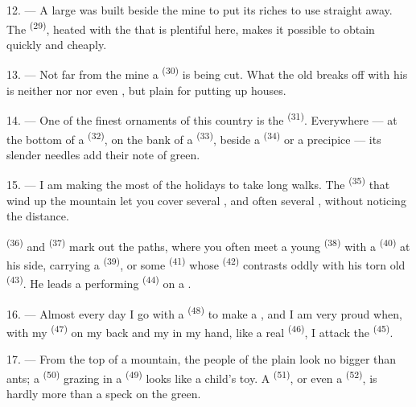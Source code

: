 12. --- A large  was built beside the mine to put its riches to use straight
away. The  \textsuperscript{(29)}, heated with the  that is
plentiful here, makes it possible to obtain  quickly and cheaply.

13. --- Not far from the mine a  \textsuperscript{(30)} is being cut. What the
old  breaks off with his  is neither  nor
 nor even
, but plain  for putting up
houses.

14. --- One of the finest ornaments of this country is the 
\textsuperscript{(31)}. Everywhere --- at the bottom of a 
\textsuperscript{(32)}, on the bank of a  \textsuperscript{(33)}, beside a
 \textsuperscript{(34)} or a precipice --- its slender needles add
their note of green.

\VUsaut{3.0mm}
\VUsaut{3.0mm}

15. --- I am making the most of the holidays to take long walks. The
 \textsuperscript{(35)} that wind up the mountain let you
cover several , and often several , without noticing the
distance.

 \textsuperscript{(36)} and  \textsuperscript{(37)} mark
out the paths, where you often meet a young  \textsuperscript{(38)} with
a  \textsuperscript{(40)} at his side, carrying a 
\textsuperscript{(39)}, or some  \textsuperscript{(41)} whose
 \textsuperscript{(42)} contrasts oddly with his torn old
 \textsuperscript{(43)}. He leads a performing 
\textsuperscript{(44)} on a .

\VUsaut{3.0mm}

16. --- Almost every day I go with a  \textsuperscript{(48)} to make a
, and I am very proud when, with my 
\textsuperscript{(47)} on my back and my  in my hand, like a real
 \textsuperscript{(46)}, I attack the  \textsuperscript{(45)}.

17. --- From the top of a mountain, the people of the plain look no bigger than ants; a
 \textsuperscript{(50)} grazing in a
 \textsuperscript{(49)} looks like a child's toy. A 
\textsuperscript{(51)}, or even a  \textsuperscript{(52)}, is hardly
more than a speck on the green.

